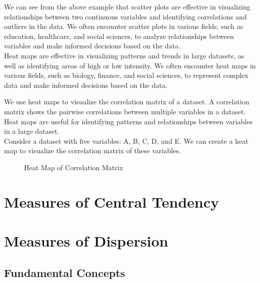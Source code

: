 \documentclass[openany]{book}
\begin{document}
We can see from the above example that scatter plots are effective in visualizing relationships between two continuous variables and identifying correlations and outliers in the data. We often encounter scatter plots in various fields, such as education, healthcare, and social sciences, to analyze relationships between variables and make informed decisions based on the data. \\
Heat maps are effective in visualizing patterns and trends in large datasets, as well as identifying areas of high or low intensity. We often encounter heat maps in various fields, such as biology, finance, and social sciences, to represent complex data and make informed decisions based on the data.
\begin{example}
We use heat maps to visualize the correlation matrix of a dataset. A correlation matrix shows the pairwise correlations between multiple variables in a dataset. Heat maps are useful for identifying patterns and relationships between variables in a large dataset. \\
Consider a dataset with five variables: A, B, C, D, and E. We can create a heat map to visualize the correlation matrix of these variables. \\
   
\begin{figure}[H]
    \centering
    \caption{Heat Map of Correlation Matrix}
\end{figure}
\end{example}
\chapter{Measures of Central Tendency}
\chapter{Measures of Dispersion}
\section{Fundamental Concepts}
\end{document}
